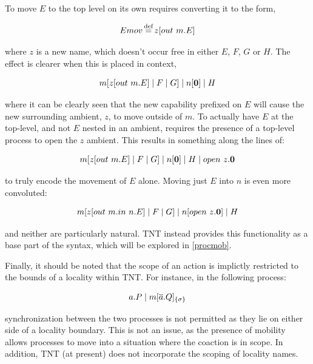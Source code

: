 To move $E$ to the top level on its own requires converting it to the
form,

\begin{equation}
Emov \operatorname{\stackrel{\textrm{def}}{=}} z[out\ m.E]
\end{equation}

\noindent where $z$ is a new name, which doesn't occur free in either
$E$, $F$, $G$ or $H$.  The effect is clearer when this is placed in
context,

\begin{equation}
m[z[out\ m.E]\;|\;F\;|\;G]\;|\;n[\textbf{0}]\;|\;H
\end{equation}

\noindent where it can be clearly seen that the new capability prefixed
on $E$ will cause the new surrounding ambient, $z$, to move outside of
$m$.  To actually have $E$ at the top-level, and not $E$ nested in an
ambient, requires the presence of a top-level process to open the $z$
ambient.  This results in something along the lines of:

\begin{equation}
m[z[out\ m.E]\;|\;F\;|\;G]\;|\;n[\textbf{0}]\;|\;H\;|\;open\ z.\textbf{0}
\end{equation}

\noindent to truly encode the movement of $E$ alone.  Moving just $E$
into $n$ is even more convoluted:

\begin{equation}
m[z[out\ m.in\ n.E]\;|\;F\;|\;G]\;|\;n[open\ z.\textbf{0}]\;|\;H
\end{equation}

\noindent and neither are particularly natural.  TNT instead provides
this functionality as a base part of the syntax, which will be explored
in \ref{procmob}.  

Finally, it should be noted that the scope of an action is implictly
restricted to the bounds of a locality within TNT.  For instance, in the
following process:

\begin{equation}
a.P \;|\; {m}[ \overline{a}.Q ]_{\{\sigma\}}
\end{equation}

\noindent synchronization between the two processes is not permitted as
they lie on either side of a locality boundary.  This is not an issue,
as the presence of mobility allows processes to move into a situation
where the coaction is in scope.  In addition, TNT (at present) does not
incorporate the scoping of locality names.

